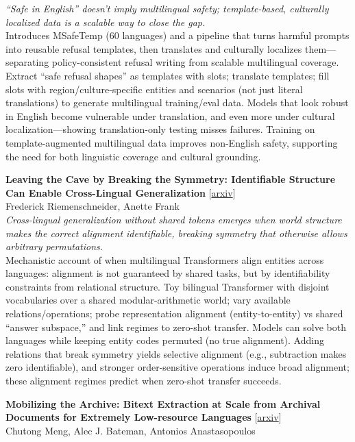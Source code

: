\documentclass[12pt,letterpaper]{article}
\begin{document}
{\small\textit{``Safe in English'' doesn't imply multilingual safety; template-based, culturally localized data is a scalable way to close the gap.}}\\[1pt]
{\footnotesize Introduces MSafeTemp (60 languages) and a pipeline that turns harmful prompts into reusable refusal templates, then translates and culturally localizes them---separating policy-consistent refusal writing from scalable multilingual coverage. Extract ``safe refusal shapes'' as templates with slots; translate templates; fill slots with region/culture-specific entities and scenarios (not just literal translations) to generate multilingual training/eval data. Models that look robust in English become vulnerable under translation, and even more under cultural localization---showing translation-only testing misses failures. Training on template-augmented multilingual data improves non-English safety, supporting the need for both linguistic coverage and cultural grounding.}

\medskip

{\small\textbf{Leaving the Cave by Breaking the Symmetry: Identifiable Structure Can Enable Cross-Lingual Generalization}} {\scriptsize[\href{https://arxiv.org/abs/2610.38509}{arxiv}]}\\
{\scriptsize Frederick Riemenschneider, Anette Frank}\\

{\small\textit{Cross-lingual generalization without shared tokens emerges when world structure makes the correct alignment identifiable, breaking symmetry that otherwise allows arbitrary permutations.}}\\[1pt]
{\footnotesize Mechanistic account of when multilingual Transformers align entities across languages: alignment is not guaranteed by shared tasks, but by identifiability constraints from relational structure. Toy bilingual Transformer with disjoint vocabularies over a shared modular-arithmetic world; vary available relations/operations; probe representation alignment (entity-to-entity) vs shared ``answer subspace,'' and link regimes to zero-shot transfer. Models can solve both languages while keeping entity codes permuted (no true alignment). Adding relations that break symmetry yields selective alignment (e.g., subtraction makes zero identifiable), and stronger order-sensitive operations induce broad alignment; these alignment regimes predict when zero-shot transfer succeeds.}

\medskip

{\small\textbf{Mobilizing the Archive: Bitext Extraction at Scale from Archival Documents for Extremely Low-resource Languages}} {\scriptsize[\href{https://arxiv.org/abs/2610.40233}{arxiv}]}\\
{\scriptsize Chutong Meng, Alec J. Bateman, Antonios Anastasopoulos}\\
\end{document}

